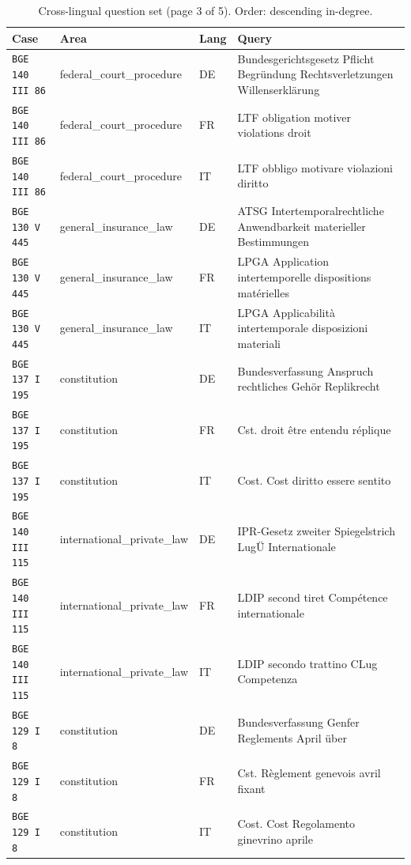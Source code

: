 \begin{table}[h]
\centering
\caption{Cross-lingual question set (page 3 of 5). Order: descending in-degree.}
\scriptsize
\setlength{\tabcolsep}{2pt}
\begin{tabular}{>{\raggedright\arraybackslash}p{2.2cm} >{\raggedright\arraybackslash}p{3.55cm} >{\raggedright\arraybackslash}p{0.8cm} >{\raggedright\arraybackslash}p{8.05cm}}
\toprule
\textbf{Case} & \textbf{Area} & \textbf{Lang} & \textbf{Query} \\
\midrule
\texttt{BGE 140 III 86} & federal\_court\_procedure & DE & Bundesgerichtsgesetz Pflicht Begründung Rechtsverletzungen Willenserklärung \\
\texttt{BGE 140 III 86} & federal\_court\_procedure & FR & LTF obligation motiver violations droit \\
\texttt{BGE 140 III 86} & federal\_court\_procedure & IT & LTF obbligo motivare violazioni diritto \\
\texttt{BGE 130 V 445} & general\_insurance\_law & DE & ATSG Intertemporalrechtliche Anwendbarkeit materieller Bestimmungen \\
\texttt{BGE 130 V 445} & general\_insurance\_law & FR & LPGA Application intertemporelle dispositions matérielles \\
\texttt{BGE 130 V 445} & general\_insurance\_law & IT & LPGA Applicabilità intertemporale disposizioni materiali \\
\texttt{BGE 137 I 195} & constitution & DE & Bundesverfassung Anspruch rechtliches Gehör Replikrecht \\
\texttt{BGE 137 I 195} & constitution & FR & Cst. droit être entendu réplique \\
\texttt{BGE 137 I 195} & constitution & IT & Cost. Cost diritto essere sentito \\
\texttt{BGE 140 III 115} & international\_private\_law & DE & IPR-Gesetz zweiter Spiegelstrich LugÜ Internationale \\
\texttt{BGE 140 III 115} & international\_private\_law & FR & LDIP second tiret Compétence internationale \\
\texttt{BGE 140 III 115} & international\_private\_law & IT & LDIP secondo trattino CLug Competenza \\
\texttt{BGE 129 I 8} & constitution & DE & Bundesverfassung Genfer Reglements April über \\
\texttt{BGE 129 I 8} & constitution & FR & Cst. Règlement genevois avril fixant \\
\texttt{BGE 129 I 8} & constitution & IT & Cost. Cost Regolamento ginevrino aprile \\

\end{tabular}
\end{table}
